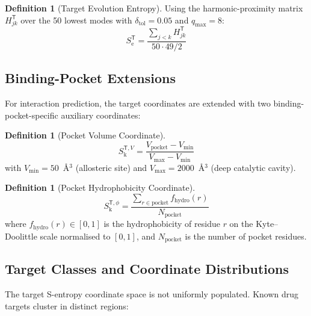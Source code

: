 \documentclass[11pt,twocolumn,a4paper]{article}
\theoremstyle{definition}
\newtheorem{definition}[theorem]{Definition}
\theoremstyle{remark}
\newcommand{\Sk}{S_{\mathrm{k}}}
\newcommand{\Se}{S_{\mathrm{e}}}
\newcommand{\Target}{\mathsf{T}}
\begin{document}
\begin{definition}[Target Evolution Entropy]
\label{def:target_se}
Using the harmonic-proximity matrix $H_{jk}^\Target$ over the 50 lowest modes with $\delta_{\mathrm{tol}} = 0.05$ and $q_{\max} = 8$:
\begin{equation}
\Se^\Target = \frac{\sum_{j<k} H_{jk}^\Target}{50 \cdot 49/2}
\end{equation}
\end{definition}

\subsection{Binding-Pocket Extensions}

For interaction prediction, the target coordinates are extended with two binding-pocket-specific auxiliary coordinates:

\begin{definition}[Pocket Volume Coordinate]
\label{def:pocket_vol}
\begin{equation}
\Sk^{\Target,V} = \frac{V_{\mathrm{pocket}} - V_{\min}}{V_{\max} - V_{\min}}
\end{equation}
with $V_{\min} = 50$~\AA$^3$ (allosteric site) and $V_{\max} = 2000$~\AA$^3$ (deep catalytic cavity).
\end{definition}

\begin{definition}[Pocket Hydrophobicity Coordinate]
\label{def:pocket_hydro}
\begin{equation}
\Sk^{\Target,\phi} = \frac{\sum_{r \in \text{pocket}} f_{\mathrm{hydro}}(r)}{N_{\mathrm{pocket}}}
\end{equation}
where $f_{\mathrm{hydro}}(r) \in [0,1]$ is the hydrophobicity of residue $r$ on the Kyte--Doolittle scale normalised to $[0,1]$, and $N_{\mathrm{pocket}}$ is the number of pocket residues.
\end{definition}

\subsection{Target Classes and Coordinate Distributions}

The target S-entropy coordinate space is not uniformly populated. Known drug targets cluster in distinct regions:
\end{document}
